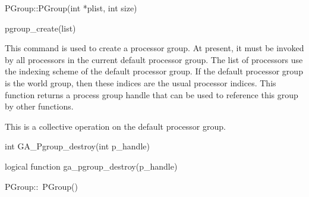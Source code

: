 \documentclass[12pt]{article}
\begin{document}
\begin{cxxapi}
\begin{cxxcode}
PGroup::PGroup(int *plist, int size)
\end{cxxcode}
\begin{funcargs}
\end{funcargs}
\end{cxxapi}

\begin{pyapi}
\begin{pycode}
pgroup_create(list)
\end{pycode}
\end{pyapi}

\begin{desc}

  This command is used to create a processor group. At present, it
  must be invoked by all processors in the current default processor
  group. The list of processors use the indexing scheme of the default
  processor group. If the default processor group is the world group,
  then these indices are the usual processor indices. This function
  returns a process group handle that can be used to reference this
  group by other functions.

  This is a collective operation on the default processor group.

\end{desc}



\begin{capi}
\begin{ccode}
int GA_Pgroup_destroy(int p_handle)
\end{ccode}
\begin{funcargs}
\end{funcargs}
\end{capi}

\begin{fapi}
\begin{fcode}
logical function ga_pgroup_destroy(p_handle)
\end{fcode}
\begin{funcargs}
\end{funcargs}
\end{fapi}

\begin{cxxapi}
\begin{cxxcode}
PGroup::~PGroup()
\end{cxxcode}
\end{cxxapi}
\end{document}

